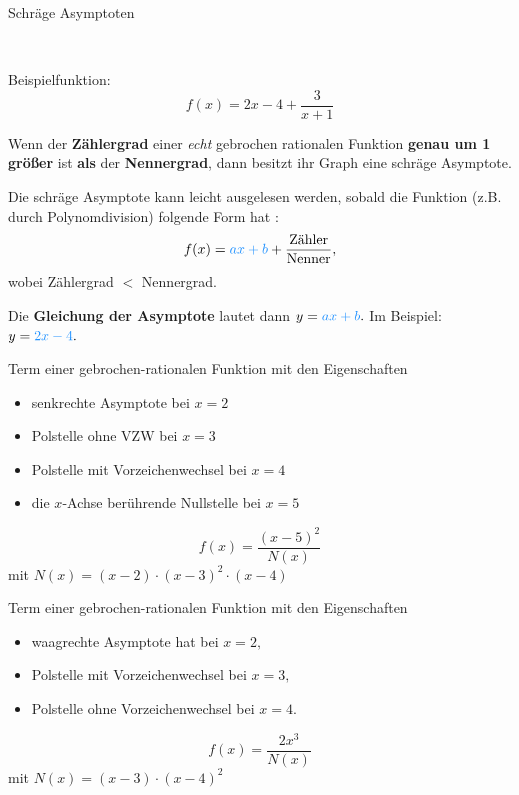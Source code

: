 \documentclass[paper=a6,ngerman,twoside=true,fontsize=14pt, parskip = half]{scrartcl}
\begin{document}
\begin{frage}
	Schräge Asymptoten
	
	~

	\normalsize Beispielfunktion:
	\[f(x)=2x -4 +\frac{3}{x+1}\]
\end{frage}
\begin{antwort}
		Wenn der \textbf{Zählergrad} einer \emph{echt}
			gebrochen rationalen Funktion 
			\textbf{genau um 1 größer} ist \textbf{als} der 
			\textbf{Nennergrad},
			 dann besitzt ihr Graph eine schräge Asymptote. 
		
		Die schräge Asymptote kann leicht ausgelesen werden,
			sobald die Funktion (z.B. durch Polynomdivision) folgende Form hat : 
		\[f(x)= {\color{DodgerBlue} ax+b} + \frac{\text{Zähler}}{\text{Nenner}},\]
		wobei Zählergrad $<$ Nennergrad. 

		Die \textbf{Gleichung der Asymptote} lautet dann
		$ y={\color{DodgerBlue}ax+b}.$	
		Im Beispiel: $y= {\color{DodgerBlue} 2x-4}.$
\end{antwort}
\begin{frage}
	Term einer gebrochen-rationalen Funktion mit den Eigenschaften
	\normalsize
	\begin{itemize}
		\item senkrechte Asymptote bei $x=2$		
		\item Polstelle ohne VZW bei $x=3$
		\item Polstelle mit Vorzeichenwechsel bei $x=4$
		\item die $x$-Achse berührende Nullstelle bei $x=5$		
	\end{itemize} 
\end{frage}
\begin{antwort}
	\[ f(x)=\frac{ (x-5)^2 }{N(x)} \]
	mit $N(x)=(x-2) \cdot (x-3)^2 \cdot (x-4)$
\end{antwort}
\begin{frage}
	Term einer gebrochen-rationalen Funktion mit den Eigenschaften
	\normalsize
	\begin{itemize}
		\item waagrechte Asymptote hat bei $x=2,$		
		\item Polstelle mit Vorzeichenwechsel bei $x=3,$ 
		\item Polstelle ohne Vorzeichenwechsel bei $x=4.$	
		
	\end{itemize} 
	
\end{frage}
\begin{antwort}
	\[ f(x)=\frac{ 2x^3}{N(x)} \]
	mit $N(x)=(x-3) \cdot (x-4)^2$
\end{antwort}
\end{document}
